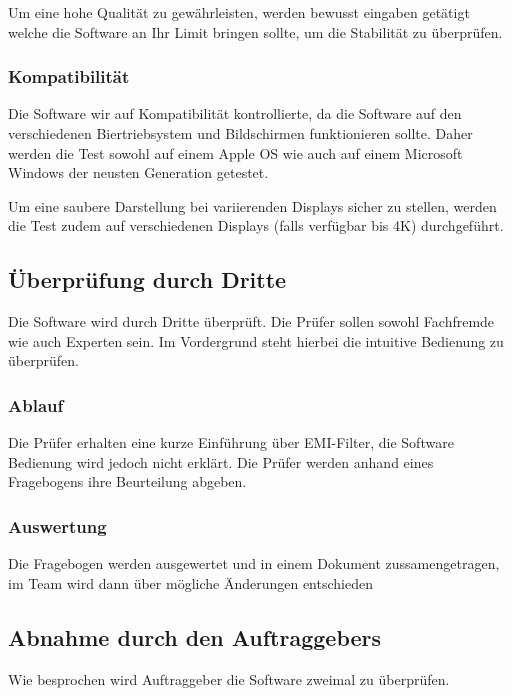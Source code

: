 Um eine hohe Qualität zu gewährleisten, werden bewusst eingaben getätigt welche die Software an Ihr Limit bringen sollte, um die Stabilität zu überprüfen. 

\subsubsection{Kompatibilität} \label{subsubsec:2}
 
Die Software wir auf Kompatibilität kontrollierte, da die Software auf den verschiedenen Biertriebsystem und Bildschirmen funktionieren sollte. Daher werden die Test sowohl auf  einem Apple OS wie auch auf einem Microsoft Windows der neusten Generation getestet.

Um eine saubere Darstellung bei variierenden Displays sicher zu stellen, werden die Test zudem auf verschiedenen Displays (falls verfügbar bis 4K) durchgeführt.

\subsection{Überprüfung durch Dritte} \label{subsec:4}

Die Software wird durch Dritte überprüft. Die Prüfer sollen sowohl Fachfremde wie auch Experten sein. Im Vordergrund steht hierbei die intuitive Bedienung zu überprüfen.

\subsubsection{Ablauf} \label{subsubsec:1}

Die Prüfer erhalten eine kurze Einführung über EMI-Filter, die Software Bedienung wird jedoch nicht erklärt. Die Prüfer werden anhand eines Fragebogens ihre Beurteilung abgeben.

\subsubsection{Auswertung} \label{subsubsec:2}

Die  Fragebogen  werden ausgewertet und  in einem Dokument zussamengetragen, im Team wird dann über mögliche Änderungen entschieden 

\subsection{Abnahme durch den Auftraggebers} \label{subsec:4}

Wie besprochen wird Auftraggeber die Software zweimal zu überprüfen.

